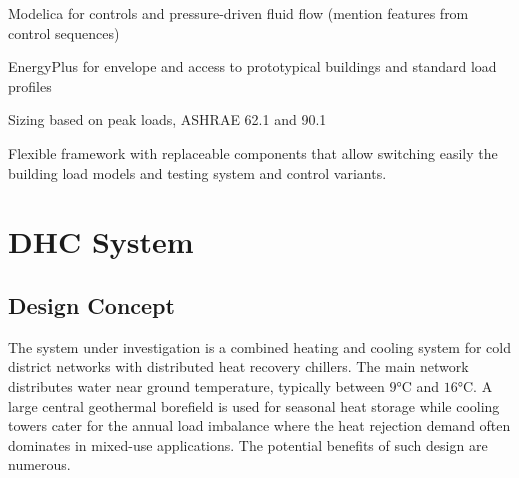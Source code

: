 Modelica for controls and pressure-driven fluid flow (mention features from control sequences)

EnergyPlus for envelope and access to prototypical buildings and standard load profiles

Sizing based on peak loads, ASHRAE 62.1 and 90.1

Flexible framework with replaceable components that allow switching easily the building load models and testing system and control variants.


\section{DHC System} \label{sec:dhc}

\subsection{Design Concept} \label{sec:concept}

The system under investigation is a combined heating and cooling system for cold district networks with distributed heat recovery chillers. The main network distributes water near ground temperature, typically between $9$°C and $16$°C. A large central geothermal borefield is used for seasonal heat storage while cooling towers cater for the annual load imbalance where the heat rejection demand often dominates in mixed-use applications.
The potential benefits of such design are numerous.

